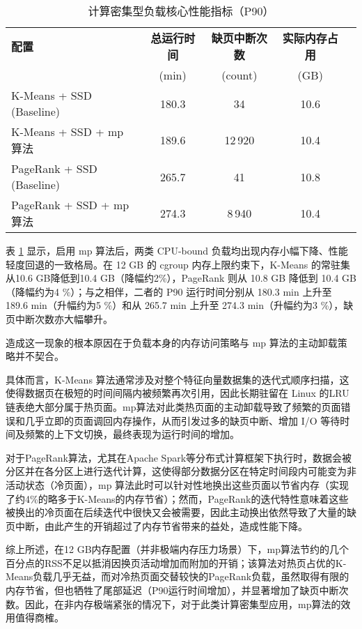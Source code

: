 \begin{table}[htbp]
    \centering
    \caption{计算密集型负载核心性能指标（P90）}
    \label{tab:perf_metrics}
    \begin{tabular}{lcccc}
      \toprule
      \textbf{配置} & \textbf{总运行时间} & \textbf{缺页中断次数} & \textbf{实际内存占用} \\
                   & (min)                & (count)               & (GB)                 \\
      \midrule
      K-Means + SSD (Baseline) & 180.3 & 34 & 10.6 \\
      K-Means + SSD + mp 算法         & 189.6 & 12\,920 & 10.4 \\
      PageRank + SSD (Baseline) & 265.7 & 41 & 10.8 \\
      PageRank + SSD + mp 算法         & 274.3 & 8\,940 & 10.4 \\
      \bottomrule
    \end{tabular}
\end{table}

表 \ref{tab:perf_metrics} 显示，启用 mp 算法后，两类 CPU-bound 负载均出现内存小幅下降、性能轻度回退的一致格局。在 12 GB 的 cgroup 内存上限约束下，K-Means 的常驻集从10.6 GB降低到10.4 GB（降幅约2\%），PageRank 则从 10.8 GB 降低到 10.4 GB（降幅约为4 \%）；与之相伴，二者的 P90 运行时间分别从 180.3 min 上升至 189.6 min（升幅约为5 \%）和从 265.7 min 上升至 274.3 min（升幅约为3 \%），缺页中断次数亦大幅攀升。

造成这一现象的根本原因在于负载本身的内存访问策略与 mp 算法的主动卸载策略并不契合。

具体而言，K-Means 算法通常涉及对整个特征向量数据集的迭代式顺序扫描，这使得数据页在极短的时间间隔内被频繁再次引用，因此长期驻留在 Linux 的LRU链表绝大部分属于热页面。mp算法对此类热页面的主动卸载导致了频繁的页面错误和几乎立即的页面调回内存操作，从而引发过多的缺页中断、增加 I/O 等待时间及频繁的上下文切换，最终表现为运行时间的增加。

对于PageRank算法，尤其在Apache Spark等分布式计算框架下执行时，数据会被分区并在各分区上进行迭代计算，这使得部分数据分区在特定时间段内可能变为非活动状态（冷页面），mp 算法此时可以针对性地换出这些页面以节省内存（实现了约4\%的略多于K-Means的内存节省）；然而，PageRank的迭代特性意味着这些被换出的冷页面在后续迭代中很快又会被需要，因此主动换出依然导致了大量的缺页中断，由此产生的开销超过了内存节省带来的益处，造成性能下降。

综上所述，在12 GB内存配置（并非极端内存压力场景）下，mp算法节约的几个百分点的RSS不足以抵消因换页活动增加而附加的开销；该算法对热页占优的K-Means负载几乎无益，而对冷热页面交替较快的PageRank负载，虽然取得有限的内存节省，但也牺牲了尾部延迟（P90运行时间增加），并显著增加了缺页中断次数。因此，在非内存极端紧张的情况下，对于此类计算密集型应用，mp算法的效用值得商榷。


